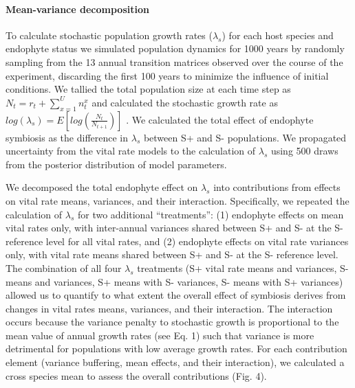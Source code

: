 \documentclass[12pt]{article}
\begin{document}
\paragraph*{Mean-variance decomposition} To calculate stochastic population growth rates ($\lambda_s$) for each host species and endophyte status we simulated population dynamics for 1000 years by randomly sampling from the 13 annual transition matrices observed over the course of the experiment, discarding the first 100 years to minimize the influence of initial conditions. 
We tallied the total population size at each time step as  $N_{t} = r_{t} + \sum_{x=1}^{U}n^x_{t}$ and calculated the stochastic growth rate as $log(\lambda_s) = E[log(\frac{N_{t}}{N_{t+1}})]$ \cite{caswell2001matrix,rees2009integral}.
We calculated the total effect of endophyte symbiosis as the difference in $\lambda_s$ between S+ and S- populations. 
We propagated uncertainty from the vital rate models to the calculation of $\lambda_s$ using 500 draws from the posterior distribution of model parameters. 

We decomposed the total endophyte effect on $\lambda_s$ into contributions from effects on vital rate means, variances, and their interaction. 
Specifically, we repeated the calculation of $\lambda_s$ for two additional ``treatments'': (1) endophyte effects on mean vital rates only, with inter-annual variances shared between S+ and S- at the S- reference level for all vital rates, and (2) endophyte effects on vital rate variances only, with vital rate means shared between S+ and S- at the S- reference level. 
The combination of all four $\lambda_s$ treatments (S+ vital rate means and variances, S- means and variances, S+ means with S- variances, S- means with S+ variances) allowed us to quantify to what extent the overall effect of symbiosis derives from changes in vital rates means, variances, and their interaction. 
The interaction occurs because the variance penalty to stochastic growth is proportional to the mean value of annual growth rates (see Eq. 1) such that variance is more detrimental for populations with low average growth rates. 
For each contribution element (variance buffering, mean effects, and their interaction), we calculated a cross species mean to assess the overall contributions (Fig. 4).
\end{document}
